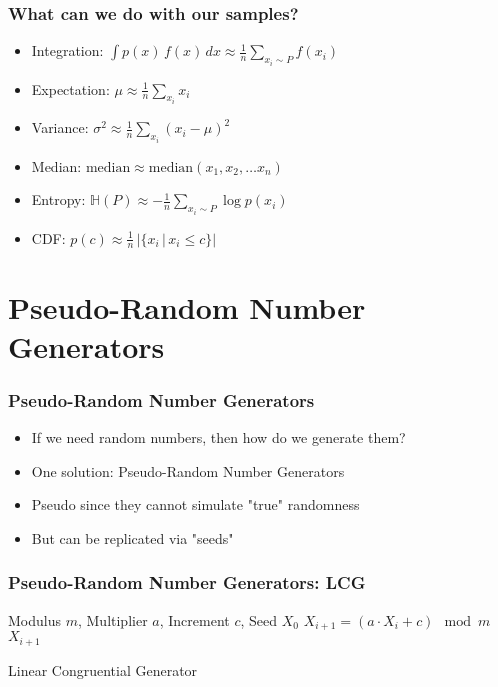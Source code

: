\documentclass{beamer}
\begin{document}


\begin{frame}
\frametitle{What can we do with our samples?}
\begin{itemize}
  \item Integration: $\int p(x) \, f(x) \, dx \approx \frac{1}{n} \sum_{x_i \sim P} f(x_i) $
  \item Expectation: $ \mu \approx \frac{1}{n} \sum_{x_i} x_i $
  \item Variance: $ \sigma^2 \approx \frac{1}{n} \sum_{x_i} \left( x_i - \mu \right)^2$
  \item Median: $\text{median} \approx \text{median} (x_1, x_2, \hdots x_n)$
  \item Entropy: $\mathbb{H}(P) \approx - \frac{1}{n} \sum_{x_i \sim P} \log p (x_i)$
  \item CDF: $p(c) \approx \frac{1}{n} \, \vert \{ x_i \, | \, x_i \leq c \} \vert$
\end{itemize}
\end{frame}




\section{Pseudo-Random Number Generators}
\begin{frame}
\frametitle{Pseudo-Random Number Generators}
\begin{itemize}
  \item If we need random numbers, then how do we generate them?
  \item One solution: Pseudo-Random Number Generators
  \item Pseudo since they cannot simulate "true" randomness
  \item But can be replicated via "seeds"
\end{itemize}
\end{frame}


\begin{frame}
\frametitle{Pseudo-Random Number Generators: LCG}
\begin{algorithm}[H]
\begin{algorithmic}[1]
  \REQUIRE Modulus $m$, Multiplier $a$, Increment $c$, Seed $X_0$
  \STATE $X_{i+1} = \left( a \cdot X_i + c \right) \mod m$
  \ENSURE $X_{i+1}$
\end{algorithmic}
\caption{Linear Congruential Generator}
\end{algorithm}
\end{frame}
\end{document}
